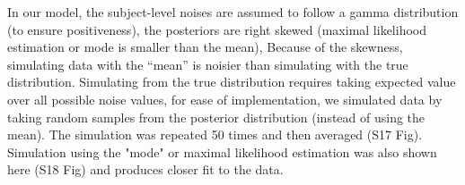 \documentclass[12pt]{article}
\newcommand{\bcaption}[2]{\caption[#1]{\textbf{#1} #2}}
\renewcommand{\includegraphics}[2][]{}
\renewcommand{\caption}[1]{}
\begin{document}
	
	


	
	In our model, the subject-level noises are assumed to follow a gamma distribution (to ensure positiveness), the posteriors are right skewed (maximal likelihood estimation or mode is smaller than the mean), Because of the skewness, simulating data with the “mean” is noisier than simulating with the true distribution. Simulating from the true distribution requires taking expected value over all possible noise values, for ease of implementation, we simulated data by taking random samples from the posterior distribution (instead of using the mean). The simulation was repeated 50 times and then averaged (S17 Fig). Simulation using the "mode" or maximal likelihood estimation was also shown here (S18 Fig) and produces closer fit to the data. 
	
	
\end{document}
